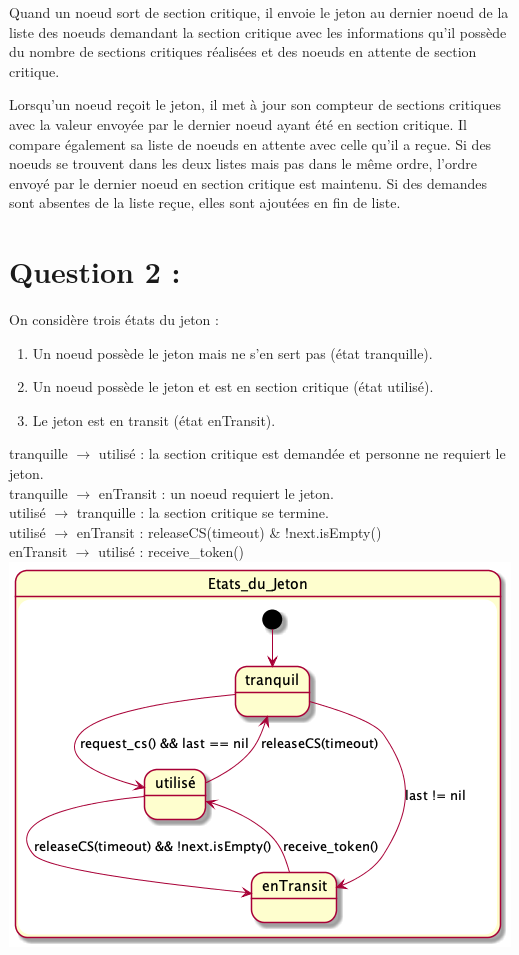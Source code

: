 \documentclass[11pt,a4paper]{report}
\begin{document}
Quand un noeud sort de section critique, il envoie le jeton au dernier noeud de la liste des noeuds demandant la section critique avec les informations qu'il possède du nombre de sections critiques réalisées et des noeuds en attente de section critique.

Lorsqu'un noeud reçoit le jeton, il met à jour son compteur de sections critiques avec la valeur envoyée par le dernier noeud ayant été en section critique. Il compare également sa liste de noeuds en attente avec celle qu'il a reçue. Si des noeuds se trouvent dans les deux listes mais pas dans le même ordre, l'ordre envoyé par le dernier noeud en section critique est maintenu. Si des demandes sont absentes de la liste reçue, elles sont ajoutées en fin de liste.


\section{Question 2 :}

On considère trois états du jeton :
\begin{enumerate}
	\item Un noeud possède le jeton mais ne s’en sert pas (état tranquille).
	\item Un noeud possède le jeton et est en section critique (état utilisé).
	\item Le jeton est en transit (état enTransit).
\end{enumerate}

tranquille $\rightarrow$ utilisé : la section critique est demandée et personne ne requiert le jeton.\\
tranquille $\rightarrow$ enTransit : un noeud requiert le jeton.\\
utilisé $\rightarrow$ tranquille : la section critique se termine.\\
utilisé $\rightarrow$ enTransit : releaseCS(timeout) \& !next.isEmpty()\\
enTransit $\rightarrow$ utilisé : receive\_token()\\

\includegraphics[scale=0.3]{../Diagrammes/exercice_1-question_2.png}
\end{document}

